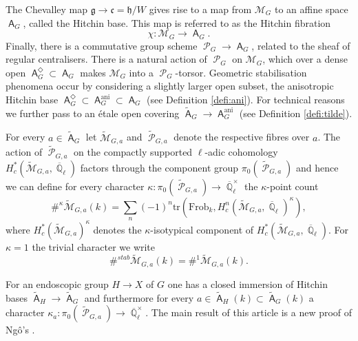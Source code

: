 \documentclass{article}
\DeclareMathOperator{\A}{\mathsf{A}}
\DeclareMathOperator{\ani}{ani}
\newcommand{\Mc}{\mathcal{M}}
\DeclareMathOperator{\Pc}{\mathcal{P}}
\DeclareMathOperator{\Qb}{\mathbb{Q}}
\newcommand{\g}{\mathfrak{g} }
\newcommand{\FA}{\A}
\newcommand{\cc}{\mathfrak{c} }
\theoremstyle{definition}
\theoremstyle{plain}
\begin{document}
The Chevalley map $\g \to \cc = \mathfrak{h}/W$ gives rise to a map from $\Mc_G$ to an affine space $\A_G$, called the Hitchin base. This map is referred to as the Hitchin fibration
\begin{equation}\label{hitfib}\chi: \Mc_G \to \FA_G.\end{equation}
Finally, there is a commutative group scheme $\Pc_G \to \FA_G$, related to the sheaf of regular centralisers. There is a natural action of $\Pc_G$ on $\Mc_G$, which over a dense open $\FA_G^{\Diamond} \subset \FA_G$ makes $\Mc_G$ into a $\Pc_G$-torsor. Geometric stabilisation phenomena occur by considering a slightly larger open subset, the anisotropic Hitchin base $\FA_G^{\Diamond} \subset \FA_G^{\ani} \subset \FA_G$ (see Definition \ref{defi:ani}). For technical reasons we further pass to an \'etale open covering $\widetilde{\FA}_G \to \FA_G^{\ani}$ (see Definition \ref{defi:tilde}). 

For every $a \in \widetilde{\FA}_G$ let $\widetilde{\Mc}_{G,a}$ and $\widetilde{\Pc}_{G,a}$ denote the respective fibres over $a$. The action of $\widetilde{\Pc}_{G,a}$ on the compactly supported $\ell$-adic cohomology $H^*_c(\widetilde{\Mc}_{G,a}, \overline{\Qb}_\ell)$ factors through the component group $\pi_0(\widetilde{\Pc}_{G,a})$ and hence we can define for every character $\kappa: \pi_0(\widetilde{\Pc}_{G,a}) \to \overline{\Qb}_\ell^\times$ the $\kappa$-point count
\begin{equation}\label{ladicpc}\#^\kappa \widetilde{\Mc}_{G,a}(k) = \sum_n (-1)^n \mathrm{tr}\left(\text{Frob}_k,H_c^n(\widetilde{\Mc}_{G,a}, \overline{\Qb}_\ell)^\kappa\right),\end{equation}
where $H_c^*(\widetilde{\Mc}_{G,a})^\kappa$ denotes the $\kappa$-isotypical component of $H_c^*(\widetilde{\Mc}_{G,a}, \overline{\Qb}_\ell)$. For $\kappa = \mathrm{1}$ the trivial character we write 
\[\#^{stab} \widetilde{\Mc}_{G,a}(k) = \#^{\mathrm{1}} \widetilde{\Mc}_{G,a}(k).\]

For an endoscopic group $H \to X$ of $G$ one has a closed immersion of Hitchin bases $\widetilde{\FA}_{H} \to \widetilde{\FA}_G$ and furthermore for every $a \in \widetilde{\FA}_{H}(k) \subset \widetilde{\FA}_{G}(k)$ a character $\kappa_a: \pi_0(\widetilde{\Pc}_{G,a}) \to \overline{\Qb}_\ell^\times$. The main result of this article is a new proof of Ng\^o's \cite[Theorem 6.4.2]{MR2653248}. 
\end{document}
